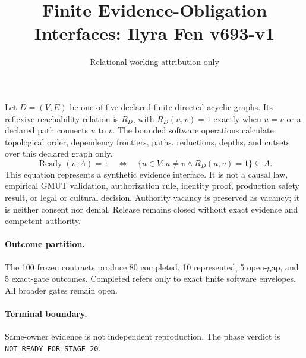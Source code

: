 \documentclass{article}
\title{Finite Evidence-Obligation Interfaces: Ilyra Fen v693-v1}
\author{Relational working attribution only}
\begin{document}
\maketitle
Let $D=(V,E)$ be one of five declared finite directed acyclic graphs.  Its reflexive reachability relation is $R_D$, with $R_D(u,v)=1$ exactly when $u=v$ or a declared path connects $u$ to $v$.  The bounded software operations calculate topological order, dependency frontiers, paths, reductions, depths, and cutsets over this declared graph only.
\[
  \operatorname{Ready}(v,A)=1 \quad\Longleftrightarrow\quad
  \{u\in V:u\ne v\land R_D(u,v)=1\}\subseteq A .
\]
This equation represents a synthetic evidence interface.  It is not a causal law, empirical GMUT validation, authorization rule, identity proof, production safety result, or legal or cultural decision.  Authority vacancy is preserved as vacancy; it is neither consent nor denial.  Release remains closed without exact evidence and competent authority.
\paragraph{Outcome partition.} The 100 frozen contracts produce 80 completed, 10 represented, 5 open-gap, and 5 exact-gate outcomes.  Completed refers only to exact finite software envelopes.  All broader gates remain open.
\paragraph{Terminal boundary.} Same-owner evidence is not independent reproduction.  The phase verdict is \texttt{NOT\_READY\_FOR\_STAGE\_20}.
\end{document}
